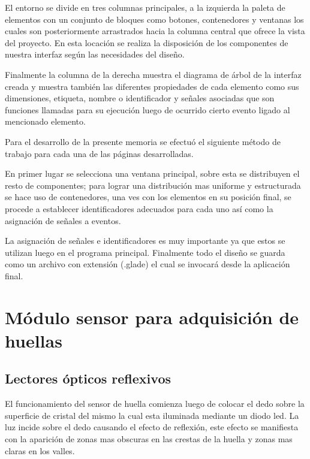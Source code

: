 El entorno se divide en tres columnas principales, a la izquierda la paleta de elementos con un conjunto de bloques como botones, contenedores y ventanas los cuales son posteriormente arrastrados hacia la columna central que ofrece la vista del proyecto. En esta locación se realiza la disposición de los componentes de nuestra interfaz según las necesidades del diseño.

Finalmente la columna de la derecha muestra el diagrama de árbol de la interfaz creada y muestra también las diferentes propiedades de cada elemento como sus dimensiones, etiqueta, nombre o identificador y señales asociadas que son funciones llamadas para su ejecución luego de ocurrido cierto evento ligado al mencionado elemento.

Para el desarrollo de la presente memoria se efectuó el siguiente método de trabajo para cada una de las páginas desarrolladas. 

En primer lugar se selecciona una ventana principal, sobre esta se distribuyen el resto de componentes; para lograr una distribución mas uniforme y estructurada se hace uso de contenedores, una ves con los elementos en su posición final, se procede a establecer identificadores adecuados para cada uno así como la asignación de señales a eventos. 

La asignación de señales e identificadores es muy importante ya que estos se utilizan luego en el programa principal.
Finalmente todo el diseño se guarda como un archivo con extensión (.glade) el cual se invocará desde la aplicación final.

\section{Módulo sensor para adquisición de huellas}
\subsection{Lectores ópticos reflexivos}
El funcionamiento del sensor  de huella comienza luego de  colocar el dedo sobre la superficie de cristal del mismo la cual esta iluminada mediante un diodo led. La luz incide sobre el dedo causando el efecto de reflexión, este efecto se manifiesta con la aparición de zonas mas obscuras en las crestas de la huella y zonas mas claras en los valles.

